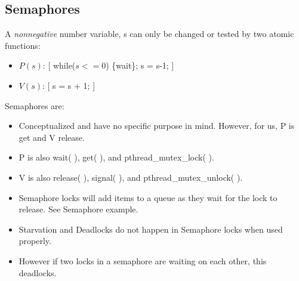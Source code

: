 \documentclass[fontsize=5pt]{scrartcl}
\begin{document}
\begin{multicols}{3}
\begin{itemize}
       \end{itemize}
       \subsection{Semaphores}
         A \textit{nonnegative} number variable, s can only be changed or tested by two atomic functions:
         \begin{itemize}
          \item $P(s)$: [ while($s<=0$) \{wait\}; s = s-1; ]
          \item $V(s)$: [ s = s + 1; ]
         \end{itemize}
         Semaphores are:
         \begin{itemize}
          \item Conceptualized and have no specific purpose in mind. However, for us, P is get and
                V release.
          \item P is also wait( ), get( ), and pthread\_mutex\_lock( ).
          \item V is also release( ), signal( ), and pthread\_mutex\_unlock( ).
          \item Semaphore locks will add items to a queue as they wait for the lock to release. See Semaphore example.
          \item Starvation and Deadlocks do not happen in Semaphore locks when used properly.
          \item However if two locks in a semaphore are waiting on each other, this deadlocks.
        \end{itemize}
        


\end{multicols}
\end{document}
